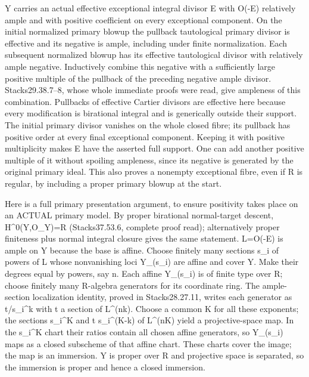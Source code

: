 \documentclass[11pt]{article}
\begin{document}
Y carries an actual effective exceptional integral divisor E with O(-E) relatively ample and with positive coefficient on every exceptional component. On the initial normalized primary blowup the pullback tautological primary divisor is effective and its negative is ample, including under finite normalization. Each subsequent normalized blowup has its effective tautological divisor with relatively ample negative. Inductively combine this negative with a sufficiently large positive multiple of the pullback of the preceding negative ample divisor. Stacks29.38.7--8, whose whole immediate proofs were read, give ampleness of this combination. Pullbacks of effective Cartier divisors are effective here because every modification is birational integral and is generically outside their support. The initial primary divisor vanishes on the whole closed fibre; its pullback has positive order at every final exceptional component. Keeping it with positive multiplicity makes E have the asserted full support. One can add another positive multiple of it without spoiling ampleness, since its negative is generated by the original primary ideal. This also proves a nonempty exceptional fibre, even if R is regular, by including a proper primary blowup at the start.

Here is a full primary presentation argument, to ensure positivity takes place on an ACTUAL primary model. By proper birational normal-target descent, H\textasciicircum{}0(Y,O\_Y)=R (Stacks37.53.6, complete proof read); alternatively proper finiteness plus normal integral closure gives the same statement. L=O(-E) is ample on Y because the base is affine. Choose finitely many sections s\_i of powers of L whose nonvanishing loci Y\_(s\_i) are affine and cover Y. Make their degrees equal by powers, say n. Each affine Y\_(s\_i) is of finite type over R; choose finitely many R-algebra generators for its coordinate ring. The ample-section localization identity, proved in Stacks28.27.11, writes each generator as t/s\_i\textasciicircum{}k with t a section of L\textasciicircum{}(nk). Choose a common K for all these exponents; the sections s\_i\textasciicircum{}K and t s\_i\textasciicircum{}(K-k) of L\textasciicircum{}(nK) yield a projective-space map. In the s\_i\textasciicircum{}K chart their ratios contain all chosen affine generators, so Y\_(s\_i) maps as a closed subscheme of that affine chart. These charts cover the image; the map is an immersion. Y is proper over R and projective space is separated, so the immersion is proper and hence a closed immersion.
\end{document}
